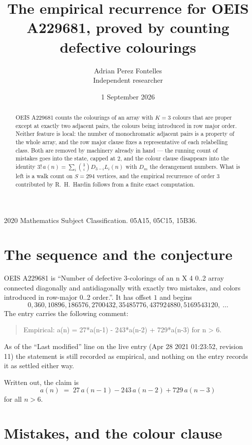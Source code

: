 \documentclass[11pt,a4paper]{article}
\title{The empirical recurrence for OEIS A229681, proved by counting defective colourings}
\author{Adrian Perez Fontelles\\ \small Independent researcher}
\date{1 September 2026}
\theoremstyle{plain}
\theoremstyle{definition}
\begin{document}
\maketitle

\begin{abstract}
OEIS A229681 counts the colourings of an array with $K=3$ colours that are proper except at
exactly two adjacent pairs, the colours being introduced in row
major order. Neither feature is local: the number of monochromatic adjacent pairs is a
property of the whole array, and the row major clause fixes a representative of each
relabelling class. Both are removed by machinery already in hand --- the running count of
mistakes goes into the state, capped at $2$, and the colour clause disappears into the
identity $3!\,a(n)=\sum_i\binom{3}{i}D_{3-i}L_i(n)$ with $D_m$ the derangement
numbers. What is left is a walk count on $S=294$ vertices, and the empirical recurrence of
order $3$ contributed by R.~H.~Hardin follows from a finite exact computation.
\end{abstract}

\noindent\small 2020 Mathematics Subject Classification. 05A15, 05C15, 15B36.\normalsize

\section{The sequence and the conjecture}

OEIS A229681 is ``Number of defective 3-colorings of an n X 4 0..2 array connected diagonally and antidiagonally with exactly two mistakes, and colors introduced in row-major 0..2 order.''. It has offset $1$ and begins
\[
0, 360, 10896, 186576, 2700432, 35485776, 437924880, 5169543120,\ \dots
\]
The entry carries the following comment:
\begin{quote}\small
Empirical: a(n) = 27*a(n-1) - 243*a(n-2) + 729*a(n-3) for n > 6.
\end{quote}
As of the ``Last modified'' line on the live entry (Apr 28 2021 01:23:52, revision 11) the statement is
still recorded as empirical, and nothing on the entry records it as settled either way.

Written out, the claim is
\begin{equation}\label{eq:conj}
a(n)\;=\;27\,a(n-1) - 243\,a(n-2) + 729\,a(n-3)
\end{equation}
for all $n>6$.

\section{Mistakes, and the colour clause}
\end{document}
